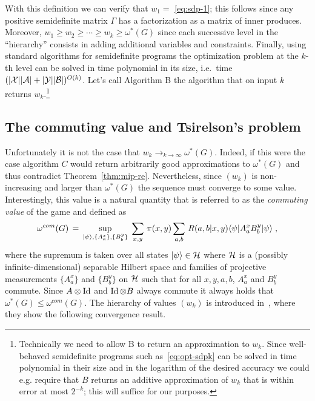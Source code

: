 With this definition we can verify that $w_1 =$ \eqref{eq:sdp-1}; this follows since any positive semidefinite matrix $\Gamma$ has a factorization as a matrix of inner produces. Moreover, $w_1 \geq w_2 \geq \cdots \geq w_k \geq \omega^*(G)$ since each successive level in the ``hierarchy'' consists in adding additional variables and constraints. Finally, using standard algorithms for semidefinite programs the optimization problem at the $k$-th level can be solved in time polynomial in its size, i.e.\ time $(|\mathcal{X}||\mathcal{A}|+|\mathcal{Y}||\mathcal{B}|)^{O(k)}$.
 Let's call Algorithm B the algorithm that on input $k$ returns $w_k$.\footnote{Technically we need to allow B to return an approximation to $w_k$. Since well-behaved semidefinite programs such as~\eqref{eq:opt-sdpk} can be solved in time polynomial in their size and in the logarithm of the desired accuracy we could e.g. require that $B$ returns an additive approximation of $w_k$ that is within error at most $2^{-k}$; this will suffice for our purposes.} 

\subsection{The commuting value and Tsirelson's problem}

Unfortunately it is not the case that $w_k\to_{k\to\infty} \omega^*(G)$. Indeed, if this were the case algorithm $C$ would return arbitrarily good approximations to $\omega^*(G)$ and thus contradict Theorem~\ref{thm:mip-re}. Nevertheless, since $(w_k)$ is non-increasing and larger than $\omega^*(G)$ the sequence must converge to some value.  Interestingly, this value is a natural quantity that is referred to as the \emph{commuting value} of the game and defined as
\begin{equation}\label{eq:val-com}
\omega^{com}(G) \,=\, \sup_{|\psi\rangle, \{A^x_a\},\{B^y_b\}} \; \sum_{x,y} \,\pi(x,y) \sum_{a,b} \,R(a,b|x,y) \langle\psi| A^x_a  B^y_b |\psi\rangle\;,
\end{equation}
where the supremum is taken over all states $|\psi\rangle \in \mathcal{H}$ where $\mathcal{H}$ is a (possibly infinite-dimensional) separable Hilbert space and families of projective measurements $\{ A^x_a\}$ and $\{  B^y_b \}$ on $\mathcal{H}$ such that for all $x,y,a,b$, $A^x_a$ and $B^y_b$ commute. Since $A \otimes \mathop{\rm Id}\nolimits$ and $\mathop{\rm Id}\nolimits \otimes B$ always commute it always holds that $\omega^*(G) \leq \omega^{com}(G)$. The hierarchy of values $(w_k)$ is introduced in~\cite{navascues2008convergent}, where they show the following convergence result. 

